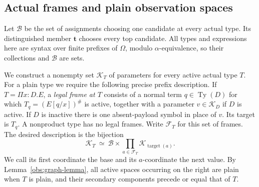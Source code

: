 \subsection{Actual frames and plain observation spaces}
\label{obs:plain-spaces}

Let $\mathcal B$ be the set of assignments choosing one candidate at
every actual type.  Its distinguished member $\mathbf t$ chooses every
top candidate.  All types and expressions here are syntax over finite
prefixes of $\Omega$, modulo $\alpha$-equivalence, so their collections
and $\mathcal B$ are sets.

We construct a nonempty set $\mathcal K_T$ of parameters for every
active actual type $T$.  For a plain type we require the following
precise prefix description.  If $T=\Pi x:D.E$, a \emph{legal frame at
$T$} consists of a normal term $q\in\operatorname{Ty}(D)$ for which
$T_q=(E[q/x])^\#$ is active, together with a parameter
$v\in\mathcal K_D$ if $D$ is active.  If $D$ is inactive there is one
absent-payload symbol in place of $v$.  Its target is $T_q$.  A
nonproduct type has no legal frames.  Write $\mathcal F_T$ for this
set of frames.  The desired description is the bijection
\begin{equation}\label{obs:plain-prefix}
 \mathcal K_T\ \simeq\
 \mathcal B\times
       \prod_{a\in\mathcal F_T}\mathcal K_{\operatorname{target}(a)}.
\end{equation}
We call its first coordinate the base and its $a$-coordinate the next
value.  By Lemma~\ref{obs:graph-lemma}, all active spaces occurring on
the right are plain when $T$ is plain, and their secondary components
precede or equal that of $T$.

